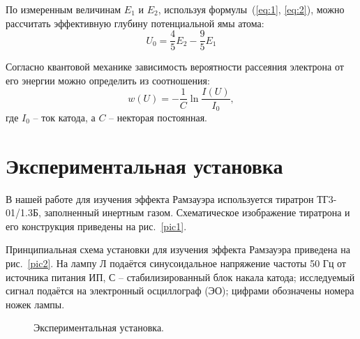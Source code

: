 \documentclass[a4paper,12pt]{article} %
\begin{document}
	По измеренным величинам $E_1$ и $E_2$, используя формулы~(\ref{eq:1}, \ref{eq:2}), можно рассчитать эффективную глубину потенциальной ямы атома:
	\begin{equation}
		\label{eq:U_0}
		U_0 = \frac{4}{5}E_2 - \frac{9}{5}E_1
	\end{equation}

	Согласно квантовой механике зависимость вероятности рассеяния электрона от его энергии можно определить из соотношения:
	\begin{equation}
		\label{eq:w}
		w(U) = -\frac{1}{C}\ln \frac{I(U)}{I_0},
	\end{equation}
	где $I_0$ -- ток катода, а $C$ -- некторая постоянная.
	
	



\section{Экспериментальная установка}
	В нашей работе для изучения эффекта Рамзауэра используется тиратрон ТГ3-01/1.3Б, заполненный инертным газом. Схематическое изображение тиратрона и его конструкция приведены на рис.~\ref{pic1}.
	
	Принципиальная схема установки для изучения эффекта Рамзауэра приведена на рис.~\ref{pic2}. На лампу Л подаётся синусоидальное напряжение частоты 50 Гц от источника питания ИП, С -- стабилизированный блок накала катода; исследуемый сигнал подаётся на электронный осциллограф (ЭО); цифрами обозначены номера ножек лампы.
	
	\begin{figure}[h!]
		{\caption{Экспериментальная установка.}}
	\end{figure}
	
\end{document}
